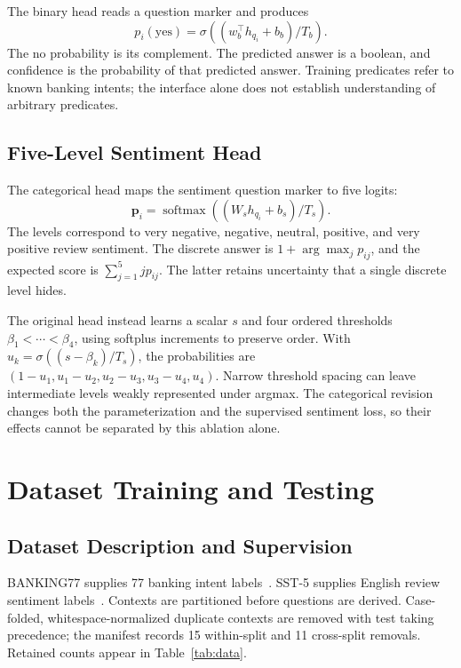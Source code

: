 \documentclass[conference]{IEEEtran}
\begin{document}
The binary head reads a question marker and produces
\begin{equation}
p_i(\mathrm{yes})=\sigma((w_b^\top h_{q_i}+b_b)/T_b).
\end{equation}
The no probability is its complement. The predicted answer is a boolean, and confidence is the probability of that predicted answer. Training predicates refer to known banking intents; the interface alone does not establish understanding of arbitrary predicates.

\subsection{Five-Level Sentiment Head}
The categorical head maps the sentiment question marker to five logits:
\begin{equation}
\boldsymbol{p}_i=\operatorname{softmax}((W_s h_{q_i}+b_s)/T_s).
\end{equation}
The levels correspond to very negative, negative, neutral, positive, and very positive review sentiment. The discrete answer is $1+\arg\max_j p_{ij}$, and the expected score is $\sum_{j=1}^{5}j p_{ij}$. The latter retains uncertainty that a single discrete level hides.

The original head instead learns a scalar $s$ and four ordered thresholds $\beta_1<\cdots<\beta_4$, using softplus increments to preserve order. With $u_k=\sigma((s-\beta_k)/T_s)$, the probabilities are $(1-u_1,u_1-u_2,u_2-u_3,u_3-u_4,u_4)$. Narrow threshold spacing can leave intermediate levels weakly represented under argmax. The categorical revision changes both the parameterization and the supervised sentiment loss, so their effects cannot be separated by this ablation alone.

\section{Dataset Training and Testing}
\subsection{Dataset Description and Supervision}
BANKING77 supplies 77 banking intent labels~\cite{banking}. SST-5 supplies English review sentiment labels~\cite{sst}. Contexts are partitioned before questions are derived. Case-folded, whitespace-normalized duplicate contexts are removed with test taking precedence; the manifest records 15 within-split and 11 cross-split removals. Retained counts appear in Table~\ref{tab:data}.
\end{document}
